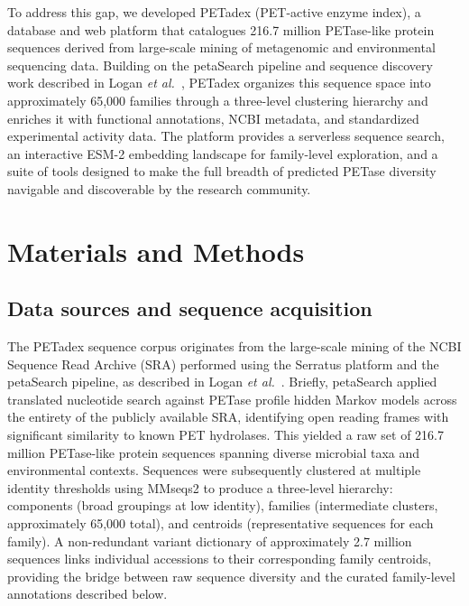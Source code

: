 \documentclass[unnumsec,webpdf,modern,large]{oup-authoring-template}
\begin{document}
To address this gap, we developed PETadex (PET-active enzyme index), a database and web platform that catalogues 216.7 million PETase-like protein sequences derived from large-scale mining of metagenomic and environmental sequencing data. Building on the petaSearch pipeline and sequence discovery work described in Logan \textit{et al.}\ \citep{chikhi_logan_2025}, PETadex organizes this sequence space into approximately 65,000 families through a three-level clustering hierarchy and enriches it with functional annotations, NCBI metadata, and standardized experimental activity data. The platform provides a serverless sequence search, an interactive ESM-2 embedding landscape for family-level exploration, and a suite of tools designed to make the full breadth of predicted PETase diversity navigable and discoverable by the research community.

\section{Materials and Methods}

\subsection{Data sources and sequence acquisition}

The PETadex sequence corpus originates from the large-scale mining of the NCBI Sequence Read Archive (SRA) performed using the Serratus platform \citep{edgar_petabase-scale_2022} and the petaSearch pipeline, as described in Logan \textit{et al.}\ \citep{chikhi_logan_2025}. Briefly, petaSearch applied translated nucleotide search against PETase profile hidden Markov models across the entirety of the publicly available SRA, identifying open reading frames with significant similarity to known PET hydrolases. This yielded a raw set of 216.7 million PETase-like protein sequences spanning diverse microbial taxa and environmental contexts. Sequences were subsequently clustered at multiple identity thresholds using MMseqs2 \citep{steinegger_mmseqs2_2017} to produce a three-level hierarchy: components (broad groupings at low identity), families (intermediate clusters, approximately 65,000 total), and centroids (representative sequences for each family). A non-redundant variant dictionary of approximately 2.7 million sequences links individual accessions to their corresponding family centroids, providing the bridge between raw sequence diversity and the curated family-level annotations described below.
\end{document}
